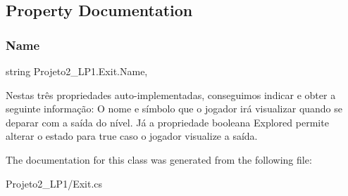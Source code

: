 \subsection{Property Documentation}
\mbox{\label{class_projeto2___l_p1_1_1_exit_a3219ddad15e0d2907e212e0b4a57da4c}} 
\subsubsection{\texorpdfstring{Name}{Name}}
{\footnotesize\ttfamily string Projeto2\+\_\+\+L\+P1.\+Exit.\+Name\hspace{0.3cm}{\ttfamily [get]}, {\ttfamily [set]}}



Nestas três propriedades auto-\/implementadas, conseguimos indicar e obter a seguinte informação\+: O nome e símbolo que o jogador irá visualizar quando se deparar com a saída do nível. Já a propriedade booleana Explored permite alterar o estado para true caso o jogador visualize a saída. 



The documentation for this class was generated from the following file\+:\begin{DoxyCompactItemize}
\item 
Projeto2\+\_\+\+L\+P1/Exit.\+cs\end{DoxyCompactItemize}

